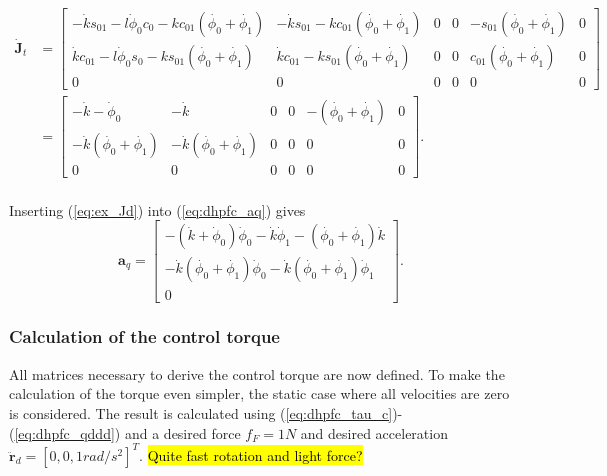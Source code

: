 \begin{equation}\label{eq:ex_Jd}
    \begin{split}
        \mathbf{\dot{J}}_t&=
        \begin{bmatrix}
            - \dot{k} s_{01} -l \dot{\phi}_0c_0 -k c_{01}(\dot{\phi_0}+\dot{\phi_1}) & -\dot{k} s_{01}-k c_{01}(\dot{\phi_0}+\dot{\phi_1}) & 0 & 0 & -s_{01}(\dot{\phi_0}+\dot{\phi_1})  & 0\\
            \dot{k} c_{01} -l \dot{\phi}_0s_0 -k s_{01}(\dot{\phi_0}+\dot{\phi_1}) & \dot{k} c_{01}-k s_{01}(\dot{\phi_0}+\dot{\phi_1}) & 0 & 0 & c_{01}(\dot{\phi_0}+\dot{\phi_1}) & 0 \\
            0 & 0 & 0 & 0 & 0 & 0
        \end{bmatrix}\\&=
        \begin{bmatrix}
            - \dot{k} -\dot{\phi}_0 & -\dot{k} & 0 & 0 & -(\dot{\phi_0}+\dot{\phi_1}) & 0 \\
            -\dot{k}(\dot{\phi_0}+\dot{\phi_1}) & -\dot{k}(\dot{\phi_0}+\dot{\phi_1}) & 0 & 0 & 0 & 0\\
            0 & 0 & 0 & 0 & 0 & 0
        \end{bmatrix}.
    \end{split}
\end{equation}
\\
Inserting (\ref{eq:ex_Jd}) into (\ref{eq:dhpfc_aq}) gives
\begin{equation}
    \mathbf{a}_q =
    \begin{bmatrix}
            - (\dot{k} +\dot{\phi}_0)\dot{\phi}_0 -\dot{k} \dot{\phi}_1 -(\dot{\phi_0}+\dot{\phi_1})\dot{k} \\
            -\dot{k}(\dot{\phi_0}+\dot{\phi_1})\dot{\phi}_0 -\dot{k}(\dot{\phi_0}+\dot{\phi_1})\dot{\phi}_1 \\
            0
        \end{bmatrix}.
\end{equation}

\subsubsection{Calculation of the control torque}

All matrices necessary to derive the control torque are now defined. To make the calculation of the torque even simpler, the static case where all velocities are zero is considered. The result is calculated using (\ref{eq:dhpfc_tau_c})-(\ref{eq:dhpfc_qddd}) and a desired force $f_F = 1 N$ and desired acceleration $\ddot{\mathbf{r}}_d = [0, 0, 1 rad/s^2]^T$. \hl{Quite fast rotation and light force?}

